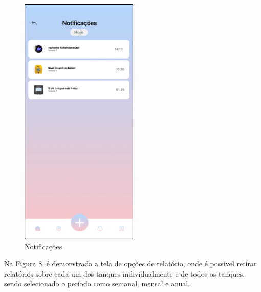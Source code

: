 \begin{figure}[!htb]
    \centering
    \caption{Notificações}%
    \label{fig:notificações}
    \includegraphics[width = 0.5\textwidth]{Imagem/Notificações.png}
\end{figure}
    
\newpage

Na Figura 8, é demonstrada a tela de opções de relatório, onde é possível retirar relatórios sobre cada um dos tanques individualmente e de todos os tanques, sendo selecionado o período como semanal, mensal e anual.

